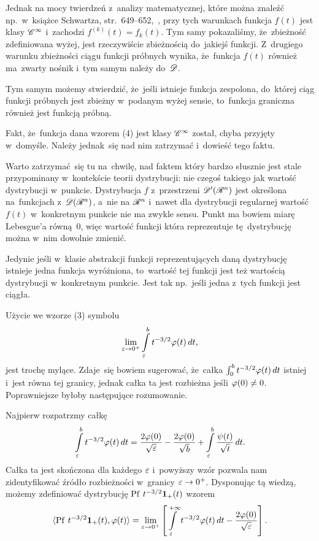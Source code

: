 \documentclass[a4paper,11pt]{article}
\begin{document}
Jednak na mocy twierdzeń z~analizy matematycznej, które można znaleźć
np.~w~książce Schwartza, str.~649--652,~\cite{Sch79}, przy tych
warunkach funkcja $f( t )$ jest klasy $\mathcal{C}^{ \infty }$ i~zachodzi
$f^{ ( k ) }( t ) = f_{ k }( t )$. Tym samy pokazaliśmy, że~zbieżność
zdefiniowana wyżej, jest rzeczywiście zbieżnością do~jakiejś funkcji.
Z~drugiego warunku zbieżności ciągu funkcji próbnych wynika,
że~funkcja $f( t )$ również ma~zwarty nośnik i~tym samym należy
do~$\mathcal{D}$.

Tym samym możemy stwierdzić, że~jeśli istnieje funkcja zespolona,
do~której ciąg funkcji próbnych jest zbieżny w~podanym wyżej sensie,
to~funkcja graniczna również jest funkcją próbną.

\start {} Fakt, że~funkcja dana wzorem (4) jest klasy $\mathcal{C}^{ \infty }$
został, chyba przyjęty w~domyśle. Należy jednak~się nad nim zatrzymać
i~dowieść tego faktu. \Dok

\start {} Warto zatrzymać~się tu na~chwilę, nad faktem który
bardzo słusznie jest stale przypominany w~kontekście teorii
dystrybucji: nie czegoś takiego jak wartość dystrybucji w~punkcie.
Dystrybucja $f$ z~przestrzeni $\mathcal{D}'( \mathcal{R}^{ n } )$ jest określona
na~funkcjach z~$\mathcal{D}( \mathcal{R}^{ n } )$, a~nie na $\mathcal{R}^{ n }$ i~nawet dla dystrybucji
regularnej wartość $f( t )$ w~konkretnym punkcie nie ma zwykle sensu.
Punkt ma bowiem miarę Lebesgue'a równą~0, więc wartość funkcji która
reprezentuje tę~dystrybucję można w~nim dowolnie zmienić.

Jedynie jeśli w~klasie abstrakcji funkcji reprezentujących daną
dystrybucję istnieje jedna funkcja wyróżniona, to~wartość tej funkcji
jest też wartością dystrybucji w~konkretnym punkcie. Jest tak
np.~jeśli jedna z~tych funkcji jest ciągła.

\start {} Użycie we wzorze (3) symbolu
\begin{equation}
  \label{eq:Zem-s01-01}
  \lim\limits_{ \varepsilon \to 0^{ + } } \int\limits_{ \varepsilon }^{ b } t^{ -3/2 } \varphi( t ) \, dt,
\end{equation}
jest trochę mylące. Zdaje~się bowiem sugerować, że~całka
$\int_{ 0 }^{ b } t^{ -3/2 } \varphi( t ) \, dt$ istniej i~jest równa tej
granicy, jednak całka ta jest rozbieżna jeśli $\varphi( 0 ) \neq 0$.
Poprawniejsze byłoby następujące
rozumowanie. %

Najpierw rozpatrzmy całkę
\begin{equation}
  \label{eq:Zem-s01-02}
  \int\limits_{ \varepsilon }^{ b } t^{ -3/2 } \varphi( t ) \, dt
  = \frac{ 2 \varphi( 0 ) }{ \sqrt{ \varepsilon } } - \frac{ 2 \varphi( 0 ) }{ \sqrt{ b } }
  + \int\limits_{ \varepsilon }^{ b } \frac{ \psi( t ) }{ \sqrt{ t } } \, dt.
\end{equation}
Całka ta jest skończona dla każdego $\varepsilon$ i~powyższy wzór pozwala
nam zidentyfikować źródło rozbieżności w~granicy $\varepsilon \to 0^{ + }$.
Dysponując tą wiedzą, możemy zdefiniować dystrybucję
$\mathrm{Pf}\, \, t^{ -3/2 } \mathbf{1}_{ + }( t )$ wzorem
\begin{equation}
  \label{eq:Zem-s01-03}
  \langle \mathrm{Pf}\, \, t^{ -3/2 } \mathbf{1}_{ + }( t ), \varphi( t ) \rangle = \lim\limits_{ \varepsilon \to 0^{ + } }
  \left[ \int\limits_{ \varepsilon }^{ +\infty } t^{ -3/2 } \varphi( t ) \, dt
    - \frac{ 2 \varphi( 0 ) }{ \sqrt{ \varepsilon } } \right].
\end{equation}
\end{document}
